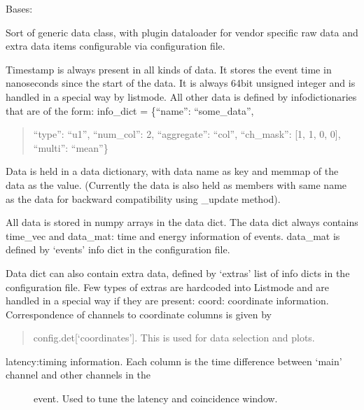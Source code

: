 \documentclass[letterpaper,10pt,english]{sphinxmanual}
\begin{document}
\begin{fulllineitems}
\label{\detokenize{autodocs/data:listmode.data.Data}}
\sphinxAtStartPar
Bases: 

\sphinxAtStartPar
Sort of generic data class, with plug\sphinxhyphen{}in dataloader for vendor specific raw data
and extra data items configurable via configuration file.

\sphinxAtStartPar
Timestamp is always present in all kinds of data. It stores the event time in nanoseconds since the start
of the data. It is always 64\sphinxhyphen{}bit unsigned integer and is handled in a special way by listmode. All other
data is defined by info\sphinxhyphen{}dictionaries that are of the form:
info\_dict = \{“name”: “some\_data”,
\begin{quote}

\sphinxAtStartPar
“type”: “u1”,
“num\_col”: 2,
“aggregate”: “col”,
“ch\_mask”: {[}1, 1, 0, 0{]},
“multi”: “mean”\}
\end{quote}

\sphinxAtStartPar
Data is held in a data dictionary, with data name as key and memmap of the data as the value. (Currently
the data is also held as members with same name as the data for backward compatibility using \_update method).

\sphinxAtStartPar
All data is stored in numpy arrays in the data dict. The data dict always contains time\_vec and data\_mat: time
and energy information of events. data\_mat is defined by ‘events’ info dict in the configuration file.

\sphinxAtStartPar
Data dict can also contain extra data, defined by ‘extras’ list of info dicts in the configuration file.
Few types of extras are hardcoded into Listmode and are handled in a special way if they are present:
coord:  coordinate information. Correspondence of channels to coordinate columns is given by
\begin{quote}

\sphinxAtStartPar
config.det{[}‘coordinates’{]}. This is used for data selection and plots.
\end{quote}
\begin{description}
\item[{latency:timing information. Each column is the time difference between ‘main’ channel and other channels in the}] \leavevmode
\sphinxAtStartPar
event. Used to tune the latency and coincidence window.


\end{description}
\end{fulllineitems}
\end{document}
